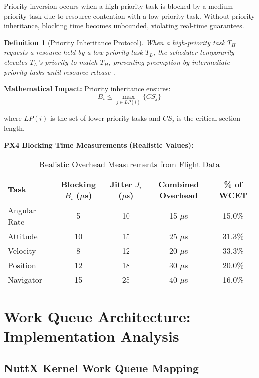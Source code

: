 \documentclass[12pt,a4paper]{article}
\newtheorem{definition}{Definition}
\begin{document}
Priority inversion occurs when a high-priority task is blocked by a medium-priority task due to resource contention with a low-priority task. Without priority inheritance, blocking time becomes unbounded, violating real-time guarantees.

\begin{definition}[Priority Inheritance Protocol]
When a high-priority task $T_H$ requests a resource held by a low-priority task $T_L$, the scheduler temporarily elevates $T_L$'s priority to match $T_H$, preventing preemption by intermediate-priority tasks until resource release \cite{sha1990}.
\end{definition}

\textbf{Mathematical Impact:} Priority inheritance ensures:
\begin{equation}
B_i \leq \max_{j \in LP(i)} \{CS_j\}
\end{equation}

where $LP(i)$ is the set of lower-priority tasks and $CS_j$ is the critical section length.

\textbf{PX4 Blocking Time Measurements (Realistic Values):}
\begin{table}[H]
\centering
\begin{tabular}{|l|c|c|c|c|}
\hline
\textbf{Task} & \textbf{Blocking $B_i$ ($\mu$s)} & \textbf{Jitter $J_i$ ($\mu$s)} & \textbf{Combined Overhead} & \textbf{\% of WCET} \\
\hline
Angular Rate & 5 & 10 & 15 $\mu$s & 15.0\% \\
Attitude & 10 & 15 & 25 $\mu$s & 31.3\% \\
Velocity & 8 & 12 & 20 $\mu$s & 33.3\% \\
Position & 12 & 18 & 30 $\mu$s & 20.0\% \\
Navigator & 15 & 25 & 40 $\mu$s & 16.0\% \\
\hline
\end{tabular}
\caption{Realistic Overhead Measurements from Flight Data}
\end{table}

\section{Work Queue Architecture: Implementation Analysis}

\subsection{NuttX Kernel Work Queue Mapping}
\end{document}
